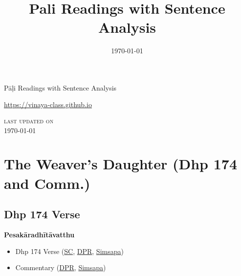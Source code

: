 \documentclass[11pt,oneside]{memoir}
\date{\today}
\title{Pali Readings with Sentence Analysis}
\begin{document}
\maketitle
\frontmatter

{\centering

{\Huge Pāḷi Readings with Sentence Analysis}

\bigskip
\href{https://vinaya-class.github.io}{https://vinaya-class.github.io}

{\scshape\small last updated on}\\
\today

}

\bigskip
\tableofcontents*

\mainmatter

\yournamefalse

\newlength{\colOne}\setlength{\colOne}{0.35\linewidth}
\newlength{\colTwo}\setlength{\colTwo}{0.6\linewidth}

\renewenvironment{quote}%
{\list{}{%
    \doubleLineSize
    \listparindent 0pt
    \itemindent    0pt
    \leftmargin    3em
    \rightmargin   3em
    \parsep        0pt
    \topsep        8pt
    \partopsep     0pt}%
\item[] \raggedright}%
{\endlist}

\chapter{The Weaver's Daughter (Dhp 174 and Comm.)}
\label{sec:org923c637}
\section{Dhp 174 Verse}
\label{sec:org5eea5ce}

\textbf{\textbf{Pesakāradhītāvatthu}}

\begin{itemize}
\item Dhp 174 Verse (\href{https://suttacentral.net/dhp167-178/pli/ms}{SC}, \href{https://www.digitalpalireader.online/\_dprhtml/index.html?loc=k.1.0.0.12.0.0.m}{DPR}, \href{http://localhost:4848/suttas/dhp167-178/pli/ms?quote=Andhabh\%25C5\%25ABto\%2520aya\%25E1\%25B9\%2581\%2520loko\&window\_type=Sutta+Study}{Simsapa})
\item Commentary (\href{https://www.digitalpalireader.online/\_dprhtml/index.html?loc=k.1.0.1.4.6.x.a}{DPR}, \href{http://localhost:4848/suttas/s0502a.att/pli/cst4?quote=andhabh\%25C5\%25ABtoti\%2520ima\%25E1\%25B9\%2581\%2520dhammadesana\%25E1\%25B9\%2581\&window\_type=Sutta+Study}{Simsapa})
\end{itemize}
\end{document}
